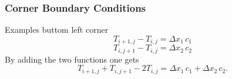 \subsubsection{Corner Boundary Conditions}
Examples buttom left corner
\begin{equation}
  T_{i+1, j} - T_{i, j} = \Delta x_1 \, c_1
\end{equation}
\begin{equation}
  T_{i, j + 1} - T_{i, j} = \Delta x_2 \, c_2
\end{equation}
By adding the two functions one gets
\begin{equation}
  T_{i+1, j} + T_{i, j + 1} - 2 T_{i, j} = \Delta x_1 \, c_1 + \Delta x_2 \, c_2.
\end{equation}

